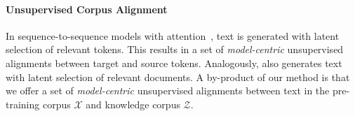 \paragraph{Unsupervised Corpus Alignment}
In sequence-to-sequence models with attention~\cite{attention}, text is generated with latent selection of relevant tokens. This results in a set of \emph{model-centric} unsupervised alignments between target and source tokens. Analogously, \thename also generates text with latent selection of relevant documents. A by-product of our method is that we offer a set of \emph{model-centric} unsupervised alignments between text in the pre-training corpus $\mathcal{X}$ and knowledge corpus $\mathcal{Z}$.








